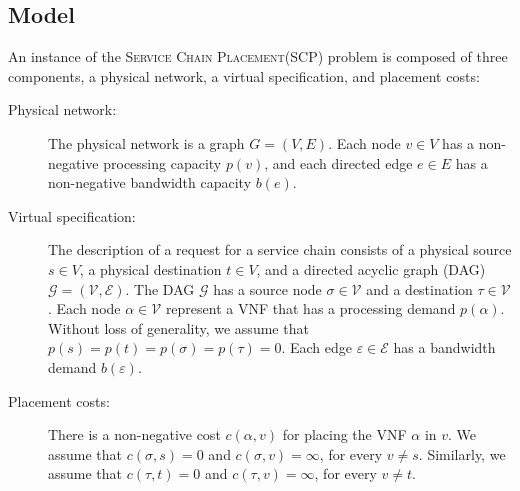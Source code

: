 \documentclass[11pt]{article}
\newcommand{\eps}{\varepsilon}
\newcommand{\scp}{\textsc{SCP}\xspace}
\newcommand{\scplong}{\textsc{Service Chain Placement}\xspace}
\newcommand{\calE}{\mathcal{E}}
\newcommand{\calG}{\mathcal{G}}
\newcommand{\calV}{\mathcal{V}}
\begin{document}
\subsection{Model}
%
An instance of the \scplong (\scp) problem is composed of three
components, a physical network, a virtual specification, and placement
costs:
\begin{description}
\item[Physical network:]
%
  The physical network is a graph $G = (V,E)$.  Each node $v \in V$
  has a non-negative processing capacity $p(v)$, and each directed
  edge $e \in E$ has a non-negative bandwidth capacity $b(e)$.
%

\medskip
  
\item[Virtual specification:]
%
  The description of a request for a service chain consists of a
  physical source $s \in V$, a physical destination $t \in V$, and a
  directed acyclic graph (DAG) $\calG = (\calV,\calE)$.
%
  The DAG $\calG$ has a source node $\sigma \in \calV$ and a
  destination $\tau \in \calV$. Each node $\alpha \in \calV$ represent
  a VNF that has a processing demand $p(\alpha)$.
%
  Without loss of generality, we assume that $p(s) = p(t) = p(\sigma) = p(\tau) =
  0$.  Each edge $\eps \in \calE$ has a bandwidth demand $b(\eps)$.

\medskip
  
\item[Placement costs:]
%
  There is a non-negative cost $c(\alpha,v)$ for placing the VNF
  $\alpha$ in $v$.  We assume that $c(\sigma,s) = 0$ and $c(\sigma,v)
  = \infty$, for every $v \neq s$.  Similarly, we assume that
  $c(\tau,t) = 0$ and $c(\tau,v) = \infty$, for every $v \neq t$.
\end{description}
\end{document}

